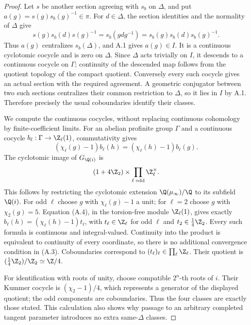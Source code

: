 \begin{proof}
Let $s$ be another section agreeing with $s_b$ on $\Delta$, and put
$a(g)=s(g)s_b(g)^{-1}\in\pi$. For $d\in\Delta$, the section identities
and the normality of $\Delta$ give
\[
 s(g)s_b(d)s(g)^{-1}=s_b(gdg^{-1})
                 =s_b(g)s_b(d)s_b(g)^{-1}.
\]
Thus $a(g)$ centralizes $s_b(\Delta)$, and A.1 gives $a(g)\in I$.
It is a continuous cyclotomic cocycle and is zero on $\Delta$.
Since $\Delta$ acts trivially on $I$, it descends to a continuous cocycle
on $\Gamma$; continuity of the descended map follows from the quotient
topology of the compact quotient. Conversely every such cocycle gives an
actual section with the required agreement. A geometric conjugator between
two such sections centralizes their common restriction to $\Delta$, so it
lies in $I$ by A.1. Therefore precisely the usual coboundaries identify
their classes.

We compute the continuous cocycles, without replacing continuous cohomology
by finite-coefficient limits. For an abelian profinite group $\Gamma$ and a
continuous cocycle $b_\ell:\Gamma\to\Z_\ell(1)$, commutativity gives
\[
 (\chi_\ell(g)-1)b_\ell(h)
       =(\chi_\ell(h)-1)b_\ell(g).                       \tag{A.4}
\]
The cyclotomic image of $G_{\Q(i)}$ is
\[
 (1+4\Z_2)\times\prod_{\ell\text{ odd}}\Z_\ell^\times.
\]
This follows by restricting the cyclotomic extension
$\Q(\mu_\infty)/\Q$ to its subfield $\Q(i)$.
For odd $\ell$ choose $g$ with $\chi_\ell(g)-1$ a unit; for $\ell=2$
choose $g$ with $\chi_2(g)=5$. Equation (A.4), in the torsion-free module
$\Z_\ell(1)$, gives exactly
$b_\ell(h)=(\chi_\ell(h)-1)t_\ell$, with
$t_\ell\in\Z_\ell$ for odd $\ell$ and $t_2\in\tfrac14\Z_2$.
Every such formula is continuous and integral-valued. Continuity into the
product is equivalent to continuity of every coordinate, so there is no
additional convergence condition in (A.3). Coboundaries correspond to
$(t_\ell)_\ell\in\prod_\ell\Z_\ell$. Their quotient is
$(\tfrac14\Z_2)/\Z_2\simeq\Z/4$.

For identification with roots of unity, choose compatible $2^n$-th roots of
$i$. Their Kummer cocycle is
$(\chi_2-1)/4$, which represents a generator of the displayed quotient;
the odd components are coboundaries. Thus the four classes are exactly
those stated. This calculation also shows why passage to an arbitrary
completed tangent parameter introduces no extra same-$\Delta$ classes.
\end{proof}

